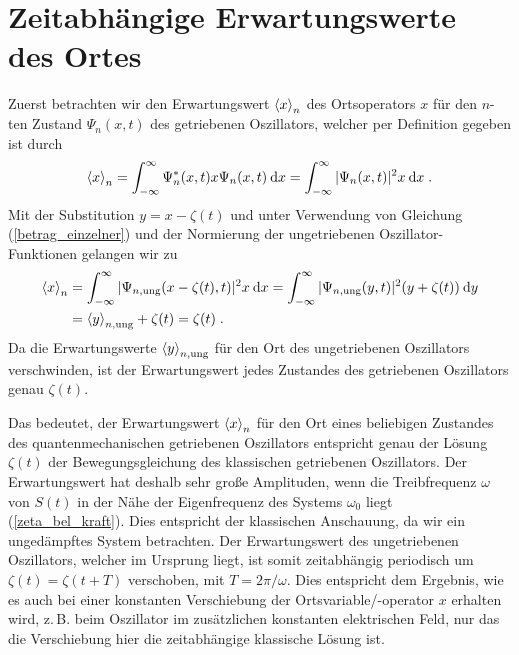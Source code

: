   \section{Zeitabhängige Erwartungswerte des Ortes}
    Zuerst betrachten wir den Erwartungswert $\braket{x}_n$ des Ortsoperators $x$ für den $n$-ten Zustand $\Psi_n(x,t)$ des getriebenen Oszillators, welcher per Definition gegeben ist durch
    \begin{equation}
      \braket{x}_n = \int_{-\infty}^{\infty} \Psi_n^*(x,t)x\Psi_n(x,t) \: \text dx
      = \int_{-\infty}^{\infty} |\Psi_n(x,t)|^2 x \: \text dx \; .
    \end{equation}
    Mit der Substitution $y=x-\zeta(t)$ und unter Verwendung von Gleichung (\ref{betrag_einzelner}) und der Normierung der ungetriebenen Oszillator-Funktionen gelangen wir zu
    \begin{align}
      \begin{split}
        \braket{x}_n &= \int_{-\infty}^{\infty} |\Psi_{n,\text{ung}}(x-\zeta(t),t)|^2 x \: \text dx
        = \int_{-\infty}^{\infty} |\Psi_{n,\text{ung}}(y,t)|^2 (y+\zeta(t)) \: \text dy \\
        &= \braket{y}_{n,\text{ung}} + \zeta(t) = \zeta(t) \; .
        \label{erwartungswert_x_einzelner}
      \end{split}
    \end{align}
    Da die Erwartungswerte $\braket{y}_{n,\text{ung}}$ für den Ort des ungetriebenen Oszillators verschwinden, ist der Erwartungswert jedes Zustandes des getriebenen Oszillators genau $\zeta(t)$.

    Das bedeutet, der Erwartungswert $\braket{x}_n$ für den Ort eines beliebigen Zustandes des quantenmechanischen getriebenen Oszillators entspricht genau der Lösung $\zeta(t)$ der Bewegungsgleichung des klassischen getriebenen Oszillators.
    Der Erwartungswert hat deshalb sehr große Amplituden, wenn die Treibfrequenz $\omega$ von $S(t)$ in der Nähe der Eigenfrequenz des Systems $\omega_0$ liegt (\ref{zeta_bel_kraft}). Dies entspricht der klassischen Anschauung, da wir ein ungedämpftes System betrachten.
    Der Erwartungswert des ungetriebenen Oszillators, welcher im Ursprung liegt, ist somit zeitabhängig periodisch um $\zeta(t)=\zeta(t+T)$ verschoben, mit $T=2\pi/\omega$.
    Dies entspricht dem Ergebnis, wie es auch bei einer konstanten Verschiebung der Ortsvariable/-operator $x$ erhalten wird, z.\,B. beim Oszillator im zusätzlichen konstanten elektrischen Feld, nur das die Verschiebung hier die zeitabhängige klassische Lösung ist.

